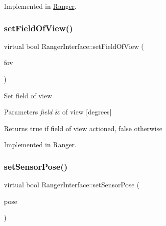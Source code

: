 Implemented in \hyperlink{classRanger_a3dc62dcba54eefbd7a0f08cbf97d87dc}{Ranger}.

\mbox{\label{classRangerInterface_a70357ca516198af45e2d503ef6af8f9f}} 
\subsubsection{\texorpdfstring{set\+Field\+Of\+View()}{setFieldOfView()}}
{\footnotesize\ttfamily virtual bool Ranger\+Interface\+::set\+Field\+Of\+View (\begin{DoxyParamCaption}\item[{unsigned int}]{fov }\end{DoxyParamCaption})\hspace{0.3cm}{\ttfamily [pure virtual]}}

Set field of view 
\begin{DoxyParams}{Parameters}
{\em field} & of view \mbox{[}degrees\mbox{]} \\
\hline
\end{DoxyParams}
\begin{DoxyReturn}{Returns}
true if field of view actioned, false otherwise 
\end{DoxyReturn}


Implemented in \hyperlink{classRanger_afb5d392ca450bcce295e61c121d09157}{Ranger}.

\mbox{\label{classRangerInterface_a452301937b5ace7ded943d8aa76a061f}} 
\subsubsection{\texorpdfstring{set\+Sensor\+Pose()}{setSensorPose()}}
{\footnotesize\ttfamily virtual bool Ranger\+Interface\+::set\+Sensor\+Pose (\begin{DoxyParamCaption}\item[{\hyperlink{structranger_1_1SensorPose}{ranger\+::\+Sensor\+Pose}}]{pose }\end{DoxyParamCaption})\hspace{0.3cm}{\ttfamily [pure virtual]}}

